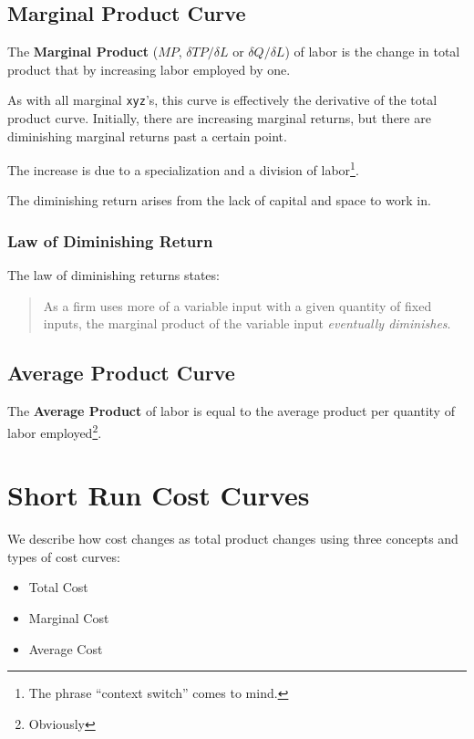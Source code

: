                 \subsection{Marginal Product Curve} %
                \label{sub:marginal_product_curve}
                    The \textbf{Marginal Product} ($MP$, $\delta TP/\delta L$ or $\delta Q/ \delta L$) of labor is the change in total product that by increasing labor employed by one.

                    As with all marginal \verb|xyz|'s, this curve is effectively the derivative of the total product curve.
                    Initially, there are increasing marginal returns, but there are diminishing marginal returns past a certain point.

                    The increase is due to a specialization and a division of labor\footnote{The phrase ``context switch'' comes to mind.}.

                    The diminishing return arises from the lack of capital and space to work in.

                    \subsubsection{Law of Diminishing Return} %
                    \label{ssub:law_of_diminishing_return}
                        The law of diminishing returns states:
                        \begin{quote}
                            As a firm uses more of a variable input with a given quantity of fixed inputs, the marginal product of the variable input \textit{eventually diminishes}.
                        \end{quote}
                \subsection{Average Product Curve} %
                \label{sub:average_product_curve}
                    The \textbf{Average Product} of labor is equal to the average product per quantity of labor employed\footnote{Obviously}.
            \section{Short Run Cost Curves} %
            \label{sec:short_run_cost_curves}
                We describe how cost changes as total product changes using three concepts and types of cost curves:
                \begin{itemize}
                    \item Total Cost
                    \item Marginal Cost
                    \item Average Cost
                \end{itemize}
